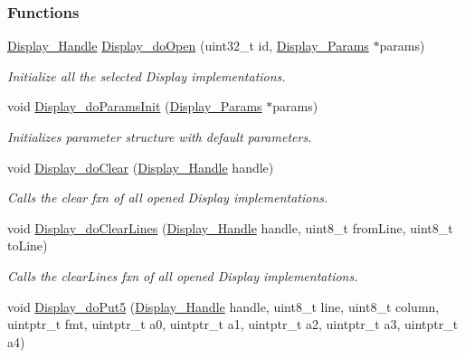 \subsubsection*{Functions}
\begin{DoxyCompactItemize}
\item 
\hyperlink{_display_8h_a045a26811755aabf1886d982c49e54ab}{Display\+\_\+\+Handle} \hyperlink{_display_8h_a3e9f4eee43bc9b70a4944e1a3961f7d2}{Display\+\_\+do\+Open} (uint32\+\_\+t id, \hyperlink{struct_display___params}{Display\+\_\+\+Params} $\ast$params)
\begin{DoxyCompactList}\small\item\em Initialize all the selected Display implementations. \end{DoxyCompactList}\item 
void \hyperlink{_display_8h_aff22833ae1cdccbbde3a57e82f85896c}{Display\+\_\+do\+Params\+Init} (\hyperlink{struct_display___params}{Display\+\_\+\+Params} $\ast$params)
\begin{DoxyCompactList}\small\item\em Initializes parameter structure with default parameters. \end{DoxyCompactList}\item 
void \hyperlink{_display_8h_a68955bb81b0db818bf2688695dca1e4a}{Display\+\_\+do\+Clear} (\hyperlink{_display_8h_a045a26811755aabf1886d982c49e54ab}{Display\+\_\+\+Handle} handle)
\begin{DoxyCompactList}\small\item\em Calls the clear fxn of all opened Display implementations. \end{DoxyCompactList}\item 
void \hyperlink{_display_8h_a443fc3167f9ce70bebf9e016443c6383}{Display\+\_\+do\+Clear\+Lines} (\hyperlink{_display_8h_a045a26811755aabf1886d982c49e54ab}{Display\+\_\+\+Handle} handle, uint8\+\_\+t from\+Line, uint8\+\_\+t to\+Line)
\begin{DoxyCompactList}\small\item\em Calls the clear\+Lines fxn of all opened Display implementations. \end{DoxyCompactList}\item 
void \hyperlink{_display_8h_a1cd0faeb6b7fcd857e4973fb1d79fac3}{Display\+\_\+do\+Put5} (\hyperlink{_display_8h_a045a26811755aabf1886d982c49e54ab}{Display\+\_\+\+Handle} handle, uint8\+\_\+t line, uint8\+\_\+t column, uintptr\+\_\+t fmt, uintptr\+\_\+t a0, uintptr\+\_\+t a1, uintptr\+\_\+t a2, uintptr\+\_\+t a3, uintptr\+\_\+t a4)

\end{DoxyCompactItemize}
